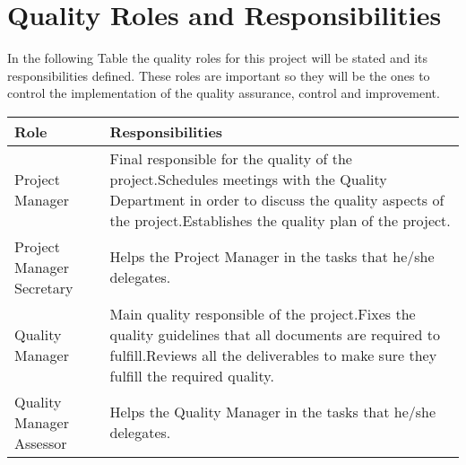 \section{Quality Roles and Responsibilities}
In the following Table the quality roles for this project will be stated and its responsibilities defined. These roles are important so they will be the ones to control the implementation of the quality assurance, control and improvement.
\begin{longtable}[H]{>{\raggedright\arraybackslash}p{5cm} p{9cm}}
	
	\toprule[2pt]
	
	\textbf{Role} &  \textbf{Responsibilities}   \\
	
	\midrule [1.5pt]
	\endhead
	
	Project Manager & Final responsible for the quality of the project.\vspace{0.3cm}\newline Schedules meetings with the Quality Department in order to discuss the quality aspects of the project.\vspace{0.3cm}\newline Establishes the quality plan of the project.
	\vspace{0.2cm} \\
	
	\midrule
		
	Project Manager Secretary & Helps the Project Manager in the tasks that he/she delegates.
	\vspace{0.2cm} \\
	
	\midrule
	
	Quality Manager & Main quality responsible of the project.\vspace{0.3cm}\newline Fixes the quality guidelines that all documents are required to fulfill.\vspace{0.3cm}\newline Reviews all the deliverables to make sure they fulfill the required quality.
	\vspace{0.2cm} \\

	\midrule
	
	Quality Manager Assessor & Helps the Quality Manager in the tasks that he/she delegates.
	\vspace{0.2cm} \\
	
	\midrule
	

\end{longtable}
